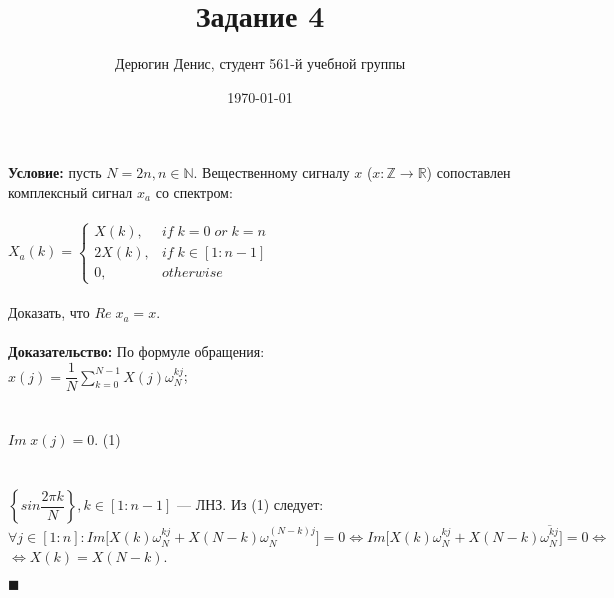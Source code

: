 \documentclass{article}
\title{Задание 4}
\author{
	Дерюгин Денис, студент 561-й учебной группы
}
\date{\today}
\newcommand\proofend{\begin{flushright}$\blacksquare$\end{flushright}}
\begin{document}
\maketitle
\large{
	\textbf{Условие:} пусть $N = 2n, n \in \mathbb{N}$. Вещественному сигналу $x$ ($x: \mathbb{Z} \rightarrow \mathbb{R}$) сопоставлен комплексный сигнал $x_a$ со спектром:\\
	\\

	$X_a(k) = \left\{\begin{matrix}
			X(k), & if\;k = 0\;or\;k = n \\ 
			2X(k), & if\;k \in \left[1 : n - 1\right]\\
			0, & otherwise
		\end{matrix}\right.$\\
	\\

	Доказать, что $Re\;x_a = x$.\\
	\\
	\textbf{Доказательство:} По формуле обращения:\\
	$x(j) = \dfrac{1}{N}\sum\limits_{k = 0}^{N - 1} X(j) \omega_N^{kj}$;\\ \\ \\
	$Im\;x(j) = 0$. (1) \\ \\ \\
	$\left\{ sin \dfrac{2\pi k}{N}\right\}, {k \in \left [ 1 : n - 1 \right ]}$ --- ЛНЗ. Из (1) следует: \\$\forall j \in \left [ 1 : n \right ] : Im \Bigg [X(k) \omega_N^{kj} + X(N - k) \omega_N^{(N - k) j} \Bigg ] = 0 \Leftrightarrow Im \Bigg [ X(k) \omega_N^{kj} + X(N - k) \overline{\omega_N^{kj}} \Bigg ] = 0 \Leftrightarrow$\\ $\Leftrightarrow X(k) = X(N - k)$.\\

	\proofend

}
\end{document}
